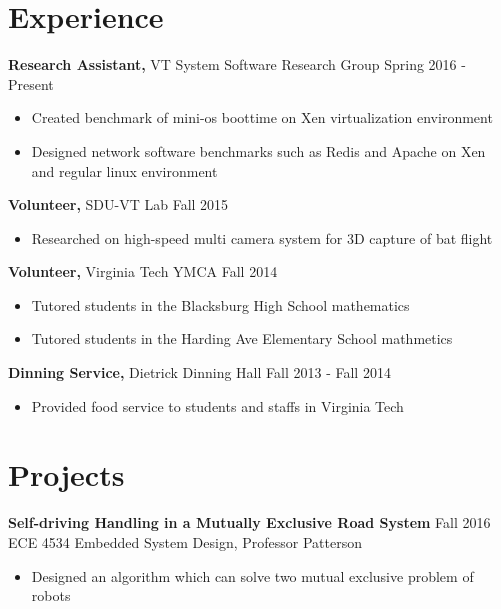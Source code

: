 \documentclass[margin]{res}
\begin{document}
\begin{resume}
  
\section{Experience} %

 {\bf Research Assistant,} VT System Software Research Group \hfill Spring 2016 - Present
 \begin{itemize} \itemsep -2pt  %
 \item Created benchmark of mini-os boottime on Xen virtualization environment
 \item Designed network software benchmarks such as Redis and Apache on Xen and 
 	regular linux environment
 \end{itemize}

{\bf Volunteer,} SDU-VT Lab \hfill  Fall 2015
\begin{itemize} \itemsep -2pt %
\item Researched on high-speed multi camera system for 3D capture of bat flight
\end{itemize}

{\bf Volunteer,} Virginia Tech YMCA  \hfill
Fall 2014                
                \begin{itemize} \itemsep -2pt
                 \item  Tutored students in the Blacksburg High School mathematics
                
                 \item Tutored students in the Harding Ave Elementary School mathmetics

		 \end{itemize}
		 
{\bf Dinning Service,} Dietrick Dinning Hall \hfill  Fall 2013 - Fall 2014
\begin{itemize} \itemsep -2pt %
\item Provided food service to students and staffs in Virginia Tech
\end{itemize}


\section{Projects} 
               {\bf Self-driving Handling in a Mutually Exclusive Road System}     \hfill         Fall 2016  \\           
                {ECE 4534 Embedded System Design, Professor Patterson} 
                 \begin{itemize} \itemsep -2pt
                 \item Designed an algorithm which can solve two mutual exclusive problem of robots
                 

\end{itemize}
\end{resume}
\end{document}
